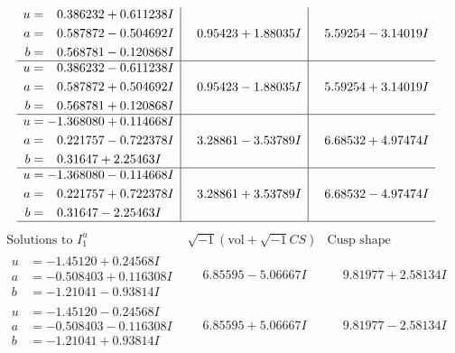 \documentclass[1p]{elsarticle_modified}
\theoremstyle{definition}
\newcommand{\I}{\sqrt{-1}}
\begin{document}
$$\begin{array}{c|c|c}
\begin{aligned}
u &= \phantom{-}0.386232 + 0.611238 I \\
a &= \phantom{-}0.587872 - 0.504692 I \\
b &= \phantom{-}0.568781 - 0.120868 I\end{aligned}
 & \phantom{-}0.95423 + 1.88035 I & \phantom{-}5.59254 - 3.14019 I \\ \hline\begin{aligned}
u &= \phantom{-}0.386232 - 0.611238 I \\
a &= \phantom{-}0.587872 + 0.504692 I \\
b &= \phantom{-}0.568781 + 0.120868 I\end{aligned}
 & \phantom{-}0.95423 - 1.88035 I & \phantom{-}5.59254 + 3.14019 I \\ \hline\begin{aligned}
u &= -1.368080 + 0.114668 I \\
a &= \phantom{-}0.221757 - 0.722378 I \\
b &= \phantom{-}0.31647 + 2.25463 I\end{aligned}
 & \phantom{-}3.28861 - 3.53789 I & \phantom{-}6.68532 + 4.97474 I \\ \hline\begin{aligned}
u &= -1.368080 - 0.114668 I \\
a &= \phantom{-}0.221757 + 0.722378 I \\
b &= \phantom{-}0.31647 - 2.25463 I\end{aligned}
 & \phantom{-}3.28861 + 3.53789 I & \phantom{-}6.68532 - 4.97474 I\\
 \hline 
 \end{array}$$\newpage$$\begin{array}{c|c|c}  
\text{Solutions to }I^u_{1}& \I (\text{vol} + \sqrt{-1}CS) & \text{Cusp shape}\\
 \hline 
\begin{aligned}
u &= -1.45120 + 0.24568 I \\
a &= -0.508403 + 0.116308 I \\
b &= -1.21041 - 0.93814 I\end{aligned}
 & \phantom{-}6.85595 - 5.06667 I & \phantom{-}9.81977 + 2.58134 I \\ \hline\begin{aligned}
u &= -1.45120 - 0.24568 I \\
a &= -0.508403 - 0.116308 I \\
b &= -1.21041 + 0.93814 I\end{aligned}
 & \phantom{-}6.85595 + 5.06667 I & \phantom{-}9.81977 - 2.58134 I \\ \hline\begin{aligned}

\end{aligned}
\end{array}$$
\end{document}
